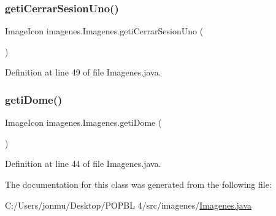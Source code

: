 \subsubsection{\texorpdfstring{geti\+Cerrar\+Sesion\+Uno()}{getiCerrarSesionUno()}}
{\footnotesize\ttfamily Image\+Icon imagenes.\+Imagenes.\+geti\+Cerrar\+Sesion\+Uno (\begin{DoxyParamCaption}{ }\end{DoxyParamCaption})}



Definition at line 49 of file Imagenes.\+java.

\mbox{\label{classimagenes_1_1_imagenes_a0f0caa5031d91592dd10a958b6b3bca0}} 
\subsubsection{\texorpdfstring{geti\+Dome()}{getiDome()}}
{\footnotesize\ttfamily Image\+Icon imagenes.\+Imagenes.\+geti\+Dome (\begin{DoxyParamCaption}{ }\end{DoxyParamCaption})}



Definition at line 44 of file Imagenes.\+java.



The documentation for this class was generated from the following file\+:\begin{DoxyCompactItemize}
\item 
C\+:/\+Users/jonmu/\+Desktop/\+P\+O\+P\+B\+L 4/src/imagenes/\mbox{\hyperlink{_imagenes_8java}{Imagenes.\+java}}\end{DoxyCompactItemize}
